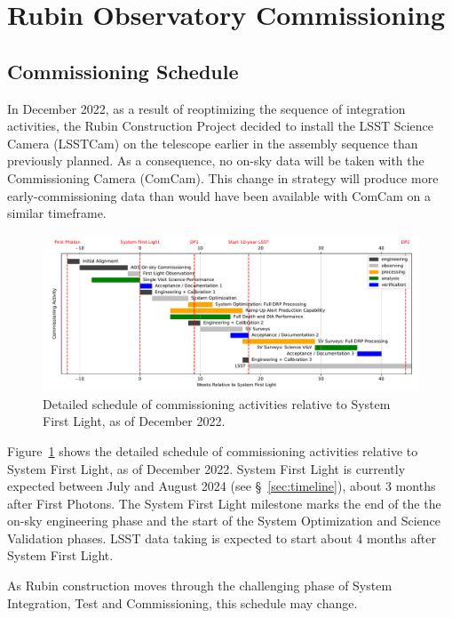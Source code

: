 \section{Rubin Observatory Commissioning}
\label{sec:commissioning}

\subsection{Commissioning Schedule}
\label{ssec:commissioning-schedule}

In December 2022, as a result of reoptimizing the sequence of integration activities, the Rubin Construction Project decided to install the LSST Science Camera (LSSTCam) on the telescope earlier in the assembly sequence than previously planned. 
As a consequence, no on-sky data will be taken with the Commissioning Camera (ComCam). 
This change in strategy will produce more early-commissioning data than would have been available with ComCam on a similar timeframe. 

\begin{figure}[htb]
\centering
\includegraphics[width=0.95\linewidth]{figures/rubinobs_on-sky_commissioning_gantt.pdf}
\caption{Detailed schedule of commissioning activities relative to System First Light, as of December 2022.}
\label{fig:commissioning-gantt}
\end{figure}

Figure~\ref{fig:commissioning-gantt} shows the detailed schedule of commissioning activities relative to System First Light, as of December 2022.  
System First Light is currently expected between July and August 2024 (see \S~\ref{sec:timeline}), about 3 months after First Photons. 
The System First Light milestone marks the end of the the on-sky engineering phase and the start of the System Optimization and Science Validation phases. 
LSST data taking is expected to start about 4 months after System First Light.

As Rubin construction moves through the challenging phase of System Integration, Test and Commissioning, this schedule may change.

